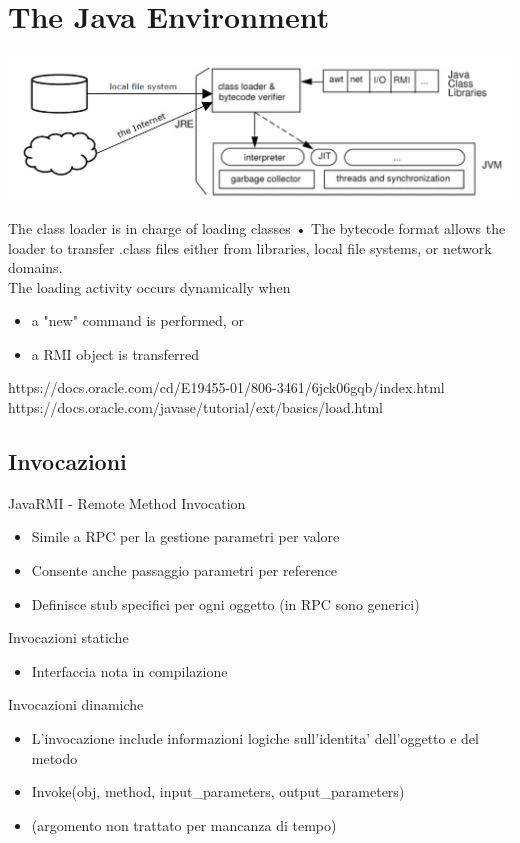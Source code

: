 \section{The Java Environment}
\begin{center}
    \includegraphics[scale=0.5]{img/RMI_JE1.jpg}
\end{center}
The class loader is in charge of loading classes • The bytecode format allows the loader to transfer .class files either from libraries, local file systems, or network domains.
\\The loading activity occurs dynamically when 
\begin{itemize}
    \item a "new" command is performed, or
    \item a RMI object is transferred
\end{itemize}
https://docs.oracle.com/cd/E19455-01/806-3461/6jck06gqb/index.html
\\https://docs.oracle.com/javase/tutorial/ext/basics/load.html

\subsection{Invocazioni}
JavaRMI - Remote Method Invocation
\begin{itemize}
    \item Simile a RPC per la gestione parametri per valore
    \item Consente anche passaggio parametri per reference
    \item Definisce stub specifici per ogni oggetto (in RPC sono generici)
\end{itemize}
Invocazioni statiche
\begin{itemize}
    \item Interfaccia nota in compilazione
\end{itemize}
Invocazioni dinamiche
\begin{itemize}
    \item L'invocazione include informazioni logiche sull'identita' dell'oggetto e del metodo
    \item Invoke(obj, method, input_parameters, output_parameters)
    \item (argomento non trattato per mancanza di tempo)
\end{itemize}
